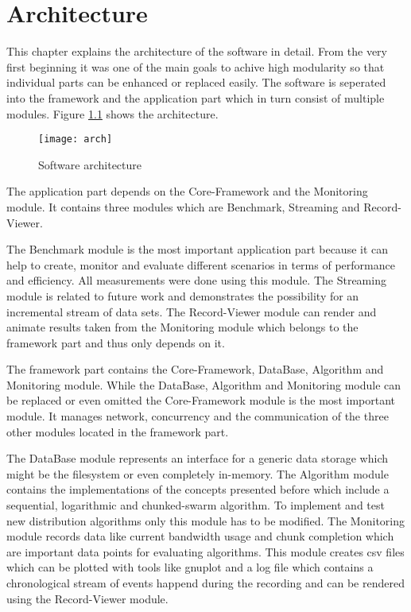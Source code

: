 \chapter{Architecture}

This chapter explains the architecture of the software in detail. From the very first beginning it was one of the main goals to achive high modularity so that individual parts can be enhanced or replaced easily. The software is seperated into the framework and the application part which in turn consist of multiple modules. Figure \ref{fig:arch} shows the architecture.

\vspace{1cm}

\begin{figure}[H]
\centering
\texttt{[image: arch]}
\caption{Software architecture}
\label{fig:arch}
\end{figure}

\clearpage

The application part depends on the Core-Framework and the Monitoring module. It contains three modules which are Benchmark, Streaming and Record-Viewer. 

The Benchmark module is the most important application part because it can help to create, monitor and evaluate different scenarios in terms of performance and efficiency. All measurements were done using this module. The Streaming module is related to future work and demonstrates the possibility for an incremental stream of data sets. The Record-Viewer module can render and animate results taken from the Monitoring module which belongs to the framework part and thus only depends on it.

The framework part contains the Core-Framework, DataBase, Algorithm and Monitoring module. While the DataBase, Algorithm and Monitoring module can be replaced or even omitted the Core-Framework module is the most important module. It manages network, concurrency and the communication of the three other modules located in the framework part. 

The DataBase module represents an interface for a generic data storage which might be the filesystem or even completely in-memory. The Algorithm module contains the implementations of the concepts presented before which include a sequential, logarithmic and chunked-swarm algorithm. To implement and test new distribution algorithms only this module has to be modified. The Monitoring module records data like current bandwidth usage and chunk completion which are important data points for evaluating algorithms. This module creates csv files which can be plotted with tools like gnuplot and a log file which contains a chronological stream of events happend during the recording and can be rendered using the Record-Viewer module.

